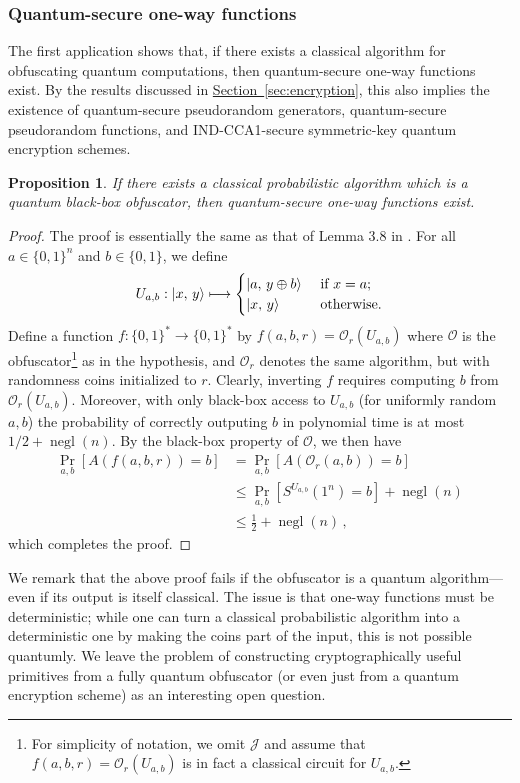 \documentclass[11pt]{article}
\numberwithin{equation}{section}
\newtheorem{prop}{Proposition}
\newcommand{\opn}{\operatorname}
\newcommand{\expref}[2]{\texorpdfstring{\hyperref[#2]{#1~\ref{#2}}}{#1~\ref{#2}}}
\newcommand{\algo}{\mathcal}
\newcommand{\negl}{\opn{negl}}
\newcommand{\prob}{\opn{Pr}}
\begin{document}
{\subsubsection{Quantum-secure one-way functions}

The first application shows that, if there exists a classical algorithm for obfuscating quantum computations, then quantum-secure one-way functions exist. By the results discussed in \expref{Section}{sec:encryption}, this also implies the existence of quantum-secure pseudorandom generators, quantum-secure pseudorandom functions, and IND-CCA1-secure symmetric-key quantum encryption schemes.

\begin{prop}
If there exists a classical probabilistic algorithm which is a quantum black-box obfuscator, then quantum-secure one-way functions exist.
\end{prop}
\begin{proof}
The proof is essentially the same as that of Lemma 3.8 in \cite{BGIRSVY12}. For all $a \in \{0, 1\}^n$ and $b \in \{0, 1\}$, we define 
$$
U_{a, b} : {\left\vert{x,\, y}\right\rangle} \longmapsto
\begin{cases}
{\left\vert{a,\, y \oplus b}\right\rangle} &\text{ if } x = a;\\
{\left\vert{x,\, y}\right\rangle} &\text{ otherwise}.
\end{cases}
$$
Define a function $f : \{0, 1\}^* \rightarrow \{0, 1\}^*$ by $f(a, b, r) = \algo O_r(U_{a, b})$ where $\algo O$ is the obfuscator\footnote{For simplicity of notation, we omit $\algo J$ and assume that $f(a, b, r) = \algo O_r(U_{a, b})$ is in fact a classical circuit for $U_{a, b}$.} as in the hypothesis, and $\algo O_r$ denotes the same algorithm, but with randomness coins initialized to $r$. Clearly, inverting $f$ requires computing $b$ from $\algo O_r(U_{a, b})$. Moreover, with only black-box access to $U_{a, b}$ (for uniformly random $a, b$) the probability of correctly outputing $b$ in polynomial time is at most $1/2 + \negl(n)$.  By the black-box property of $\mathcal O$, we then have
\begin{align*}
\prob_{a, b} [ A(f(a, b, r)) = b] 
&= \prob_{a, b} [ A(\mathcal O_r(a, b)) = b ]\\
&\leq \prob_{a, b} \left[ S^{U_{a, b}}(1^n) = b\right] + \negl(n)\\
&\leq \frac{1}{2} + \negl(n)\,,
\end{align*}
which completes the proof.
\end{proof}

We remark that the above proof fails if the obfuscator is a quantum algorithm---even if its output is itself classical. The issue is that one-way functions must be deterministic; while one can turn a classical probabilistic algorithm into a deterministic one by making the coins part of the input, this is not possible quantumly. We leave the problem of constructing cryptographically useful primitives from a fully quantum obfuscator (or even just from a quantum encryption scheme) as an interesting open question. 

}
\end{document}

